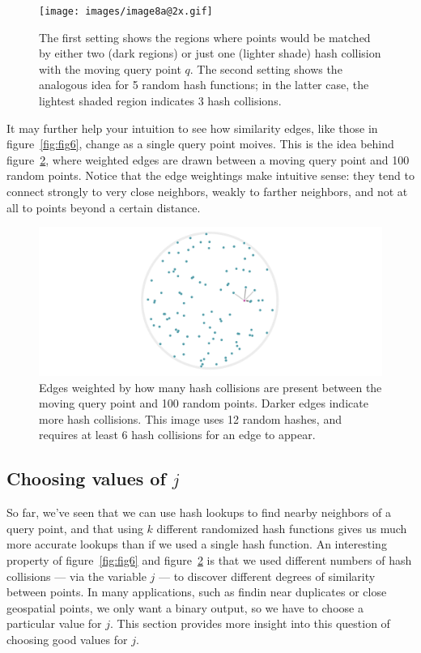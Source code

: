 \documentclass[20pt,]{extarticle}
\begin{document}
\begin{figure}
\centering
\texttt{[image: images/image8a@2x.gif]}
\caption{The first setting shows the regions where points would be
matched by either two (dark regions) or just one (lighter shade) hash
collision with the moving query point \(q\). The second setting shows
the analogous idea for 5 random hash functions; in the latter case, the
lightest shaded region indicates 3 hash collisions.}\label{fig:fig8a}
\end{figure}

It may further help your intuition to see how similarity edges, like
those in figure~\ref{fig:fig6}, change as a single query point moives.
This is the idea behind figure~\ref{fig:fig8b}, where weighted edges are
drawn between a moving query point and 100 random points. Notice that
the edge weightings make intuitive sense: they tend to connect strongly
to very close neighbors, weakly to farther neighbors, and not at all to
points beyond a certain distance.

\begin{figure}
\centering
\includegraphics{images/image8b@2x.gif}
\caption{Edges weighted by how many hash collisions are present between
the moving query point and 100 random points. Darker edges indicate more
hash collisions. This image uses 12 random hashes, and requires at least
6 hash collisions for an edge to appear.}\label{fig:fig8b}
\end{figure}

\subsection{\texorpdfstring{Choosing values of
\(j\)}{Choosing values of j}}\label{choosing-values-of-j}

So far, we've seen that we can use hash lookups to find nearby neighbors
of a query point, and that using \(k\) different randomized hash
functions gives us much more accurate lookups than if we used a single
hash function. An interesting property of figure~\ref{fig:fig6} and
figure~\ref{fig:fig8b} is that we used different numbers of hash
collisions --- via the variable \(j\) --- to discover different degrees
of similarity between points. In many applications, such as findin near
duplicates or close geospatial points, we only want a binary output, so
we have to choose a particular value for \(j\). This section provides
more insight into this question of choosing good values for \(j\).
\end{document}
